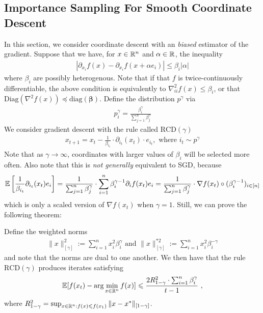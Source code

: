 	\subsection{Importance Sampling For Smooth Coordinate Descent}
	In this section, we consider coordinate descent with an \emph{biased}
  estimator of the gradient. Suppose that we have, for $x \in \mathbb{R}^n$
  and $\alpha \in \mathbb{R}$, the inequality
	\begin{eqnarray}
    |\partial_{x_i} f(x) - \partial_{x_i} f(x + \alpha e_i)|
    \le \beta_{i}|\alpha|
	\end{eqnarray}
	where $\beta_i$ are possibly heterogenous. Note that if that $f$ is twice-continuously differentiable, the above condition is equivalently to $\nabla^2_{ii}f(x) \le \beta_i$, or that $\mathrm{Diag}(\nabla^2 f(x)) \preceq \mathrm{diag}(\boldsymbol{\beta})$.  Define the distribution $p^\gamma$ via
	\begin{eqnarray}
	p^{\gamma}_i = \frac{\beta_i^{\gamma}}{\sum_{j=1}^n \beta_j^{\gamma}}
	\end{eqnarray}
	We consider gradient descent with the rule called $\mathrm{RCD}(\gamma)$
	\begin{eqnarray}\label{RCDgamma}
    x_{t+1} = x_t - \frac{1}{\beta_{i_t}} \cdot \partial_{i_t}(x_t) \cdot e_{i_t}, \text{ where } i_t \sim p^{\gamma}
	\end{eqnarray}
  Note that as $\gamma \to \infty$, coordinates with larger values of $\beta_i$
  will be selected more often.
	Also note that this is \emph{not generally} equivalent to SGD, because 
	\begin{eqnarray}
    \operatorname*{\mathbb{E}}\left[\frac{1}{\beta_{i_t}}\partial_{i_t}(x_t)e_i\right]
    = \frac{1}{\sum_{j=1}^n \beta_j^{\gamma}} \cdot \sum_{i=1}^n \beta_{i}^{\gamma - 1} \partial_i f(x_t)e_i
    = \frac{1}{\sum_{j=1}^n \beta_j^{\gamma}} \cdot \nabla f(x_t) \circ (\beta_i^{\gamma - 1})_{i \in [n]}
	\end{eqnarray}
	which is only a scaled version of $\nabla f(x_t)$ when $\gamma = 1$. Still, we can prove the following theorem:
	\begin{theorem}
  \label{thm:6.7}
  Define the weighted norms
	\begin{eqnarray}
	\|x\|_{[\gamma]}^2 := \sum_{i=1}^n x_i^2 \beta_i^\gamma \text{ and } \|x\|_{[\gamma]}^{*2} := \sum_{i=1}^n x_i^2 \beta_i^{-\gamma}
	\end{eqnarray}
	and note that the norms are dual to one another.
  We then have that the rule $\mathrm{RCD}(\gamma)$ produces iterates satisfying
	\begin{eqnarray}
	  \operatorname*{\mathbb{E}}[f(x_t) - \arg\min_{x \in \mathbb{R}^{n}} f(x)]
    \leqslant \frac{2 R^2_{1-\gamma} \cdot \sum_{i=1}^n \beta_{i}^{\gamma}}{t-1}~,
	\end{eqnarray}
	where $R^2_{1-\gamma} = \sup_{x \in \mathbb{R}^n:f(x) \leqslant f(x_1)} \|x - x^*\|_{[1 - \gamma]}$.
	\end{theorem}
